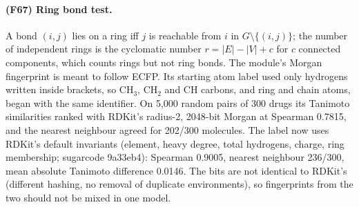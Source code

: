 \paragraph{(F67) Ring bond test.} A bond $(i,j)$ lies on a ring iff $j$ is reachable from $i$ in $G\setminus\{(i,j)\}$; the number of independent rings is the cyclomatic number $r=|E|-|V|+c$ for $c$ connected components, which counts rings but not ring bonds.
The module's Morgan fingerprint is meant to follow ECFP. Its starting atom label used only hydrogens written inside brackets, so CH$_3$, CH$_2$ and CH carbons, and ring and chain atoms, began with the same identifier. On 5,000 random pairs of 300 drugs its Tanimoto similarities ranked with RDKit's radius-2, 2048-bit Morgan at Spearman 0.7815, and the nearest neighbour agreed for 202/300 molecules. The label now uses RDKit's default invariants (element, heavy degree, total hydrogens, charge, ring membership; sugarcode 9a33eb4): Spearman 0.9005, nearest neighbour 236/300, mean absolute Tanimoto difference 0.0146. The bits are not identical to RDKit's (different hashing, no removal of duplicate environments), so fingerprints from the two should not be mixed in one model.
